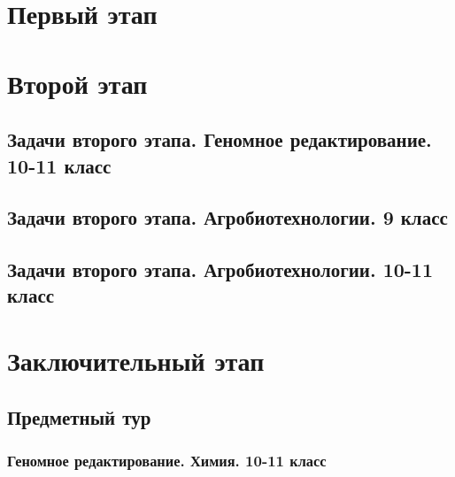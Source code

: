\documentclass[a4paper,12pt,oneside]{book}
\begin{document}

\setcounter{page}{-2}




\setcounter{tocdepth}{1}

\tableofcontents

\part{Первый этап}
\clearpage




\part{Второй этап}
\clearpage
\chapter{Задачи второго этапа. Геномное редактирование. 10-11 класс}


 
\chapter{Задачи второго этапа. Агробиотехнологии. 9 класс}


\chapter{Задачи второго этапа. Агробиотехнологии. 10-11 класс}


\part{Заключительный этап}

\clearpage
\chapter{Предметный тур}

\section{Геномное редактирование. Химия. 10-11 класс}

\end{document}
